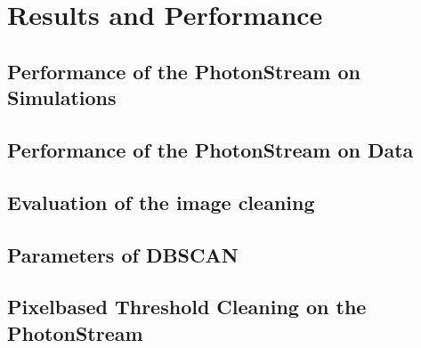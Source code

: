 \chapter{Results and Performance}
%
\section{Performance of the PhotonStream on Simulations}
%
\section{Performance of the PhotonStream on Data}
%
\section{Evaluation of the image cleaning}
%
\section{Parameters of DBSCAN}
%
\section{Pixelbased Threshold Cleaning on the PhotonStream}
%
